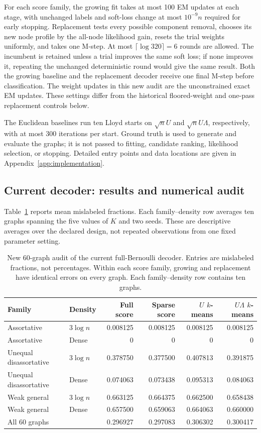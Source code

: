 For each score family, the growing fit takes at most 100 EM updates at
each stage, with unchanged labels and soft-loss change at most $10^{-9}n$
required for early stopping. Replacement tests every possible component
removal, chooses its new node profile by the all-node likelihood gain,
resets the trial weights uniformly, and takes one M-step. At most
$\lceil\log 320\rceil=6$ rounds are allowed. The incumbent is retained unless
a trial improves the same soft loss; if none improves it, repeating the
unchanged deterministic round would give the same result. Both the growing
baseline and the replacement decoder receive one final M-step before
classification. The weight updates in this new audit are the unconstrained
exact EM updates. These settings differ from the historical floored-weight
and one-pass replacement controls below.

The Euclidean baselines run ten Lloyd starts on $\sqrt n U$ and
$\sqrt n U\Lambda$, respectively, with at most 300 iterations per start.
Ground truth is used to generate and evaluate the graphs; it is not passed
to fitting, candidate ranking, likelihood selection, or stopping. Detailed
entry points and data locations are given in Appendix~\ref{app:implementation}.

\subsection{Current decoder: results and numerical audit}
Table~\ref{tab:general_density} reports mean mislabeled fractions. Each
family--density row averages ten graphs spanning the five values of $K$
and two seeds. These are descriptive averages over the declared design,
not repeated observations from one fixed parameter setting.

\begin{table}[tb]
\centering
\small
\setlength{\tabcolsep}{4pt}
\caption{New 60-graph audit of the current full-Bernoulli decoder. Entries
are mislabeled fractions, not percentages. Within each score family,
growing and replacement have identical errors on every graph. Each
family--density row contains ten graphs.}
\label{tab:general_density}
\begin{tabular}{llrrrr}
\toprule
Family&Density&Full score&Sparse score&$U$ $k$-means&$U\Lambda$ $k$-means\\
\midrule
Assortative&$3\log n$&0.008125&0.008125&0.008125&0.008125\\
Assortative&Dense&0&0&0&0\\
Unequal disassortative&$3\log n$&0.378750&0.377500&0.407813&0.391875\\
Unequal disassortative&Dense&0.074063&0.073438&0.095313&0.084063\\
Weak general&$3\log n$&0.663125&0.664375&0.662500&0.658438\\
Weak general&Dense&0.657500&0.659063&0.664063&0.660000\\
\midrule
All 60 graphs&&0.296927&0.297083&0.306302&0.300417\\
\bottomrule
\end{tabular}
\end{table}

